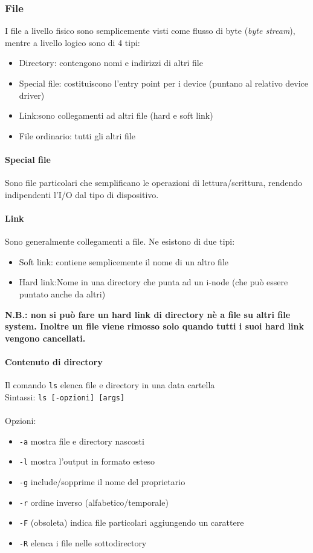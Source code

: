 \documentclass[a4paper, 10pt]{article}
\begin{document}
\subsubsection{File}
I file a livello fisico sono semplicemente visti come flusso di byte (\textit{byte stream}), mentre a livello logico sono di 4 tipi:
\begin{itemize}
\item Directory: contengono nomi e indirizzi di altri file
\item Special file: costituiscono l'entry point per i device (puntano al relativo device driver)
\item Link:sono collegamenti ad altri file (hard e soft link)
\item File ordinario: tutti gli altri file
\end{itemize}
\paragraph{Special file} Sono file particolari che semplificano le operazioni di lettura/scrittura, rendendo indipendenti l'I/O dal tipo di dispositivo.
\paragraph{Link}
Sono generalmente collegamenti a file. Ne esistono di due tipi:
\begin{itemize}
\item Soft link: contiene semplicemente il nome di un altro file
\item Hard link:Nome in una directory che punta ad un i-node (che può essere puntato anche da altri)
\end{itemize}
\textbf{N.B.: non si può fare un hard link di directory nè a file su altri file system. Inoltre un file viene rimosso solo quando tutti i suoi hard link vengono cancellati.}

\paragraph{Contenuto di directory}Il comando \verb|ls| elenca file e directory in una data cartella \\
Sintassi: \verb|ls [-opzioni] [args]| \\ \\
Opzioni:
\begin{itemize}
\item \verb|-a| mostra file e directory nascosti
\item \verb|-l| mostra l'output in formato esteso
\item \verb|-g| include/sopprime il nome del proprietario
\item \verb|-r| ordine inverso (alfabetico/temporale)
\item \verb|-F| (obsoleta) indica file particolari aggiungendo un carattere
\item \verb|-R| elenca i file nelle sottodirectory
\end{itemize}
\end{document}
